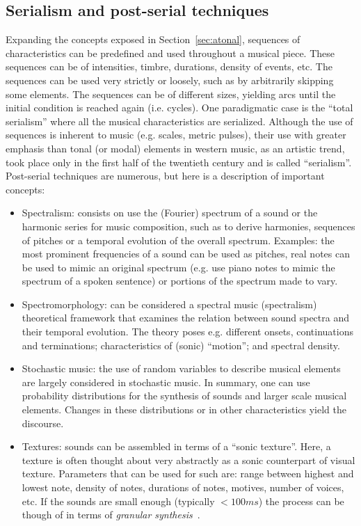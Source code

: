 \subsection{Serialism and post-serial techniques}\label{sec:ser}
Expanding the concepts exposed in Section~\ref{sec:atonal},
sequences of characteristics can be predefined and
used throughout a musical piece.
These sequences can be of intensities, timbre, durations,
density of events, etc.
The sequences can be used very strictly or loosely,
such as by arbitrarily skipping some elements.
The sequences can be of different sizes, yielding arcs
until the initial condition is reached again (i.e. cycles).
One paradigmatic case is the ``total serialism'' where all
the musical characteristics are serialized.
Although the use of sequences is inherent to music (e.g. scales, metric pulses),
their use with greater emphasis than tonal (or modal) elements
in western music, as an artistic trend, took place only in the
first half of the twentieth century and is called ``serialism''.
Post-serial techniques are numerous, but here is a description of
important concepts:
\begin{itemize}
	\item Spectralism:
		consists on use the (Fourier) spectrum of a sound or the harmonic series for music composition,
		such as
		to derive harmonies, sequences of pitches or a temporal evolution of the overall spectrum.
		Examples: the most prominent frequencies of a sound can be used as pitches,
		real notes can be used to mimic an original spectrum
		(e.g. use piano notes to mimic the spectrum of a spoken sentence) or portions of the spectrum made to vary.~\cite{grisey}
	\item Spectromorphology:
		can be considered a spectral music (spectralism) theoretical framework
		that examines the relation between sound spectra and their temporal evolution.
		The theory poses e.g. different onsets, continuations and terminations; characteristics of (sonic) ``motion'';
		and spectral density.~\cite{smalley,schaeffer}
	\item Stochastic music:
		the use of random variables to describe musical elements are largely considered in stochastic music.
		In summary, one can use probability distributions for the synthesis of sounds and larger scale musical elements.
		Changes in these distributions or in other characteristics yield the discourse.~\cite{formalized}
	\item Textures:
		sounds can be assembled in terms of a ``sonic texture''.
		Here, a texture is often thought about very abstractly
		as a sonic counterpart of visual texture.
		Parameters that can be used for such are: range between highest and lowest note,
		density of notes, durations of notes, motives, number of voices, etc.
		If the sounds are small enough (typically $< 100ms$)
		the process can be though of in terms of \emph{granular synthesis}~\cite{microsound}.
\end{itemize}

